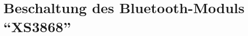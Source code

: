 
\newpage
\section{Beschaltung des Bluetooth-Moduls \enquote{XS3868}}
 \label{subsec:5.3}
%
%
%
%
%
